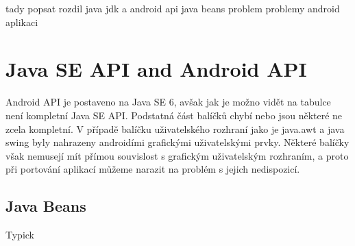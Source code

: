 tady popsat rozdil java jdk a android api
java beans problem
problemy android aplikaci


\section{Java SE API and Android API}
Android API je postaveno na Java SE 6, avšak jak je možno vidět na tabulce  není kompletní Java SE API. Podstatná část balíčků chybí nebo jsou některé ne zcela kompletní. V případě balíčku uživatelského rozhraní jako je java.awt a java swing byly nahrazeny androidími grafickými uživatelskými prvky. Některé balíčky však nemusejí mít přímou souvislost s grafickým uživatelským rozhraním, a proto při portování aplikací můžeme narazit na problém s jejich nedispozicí.

\subsection{Java Beans}
Typick

